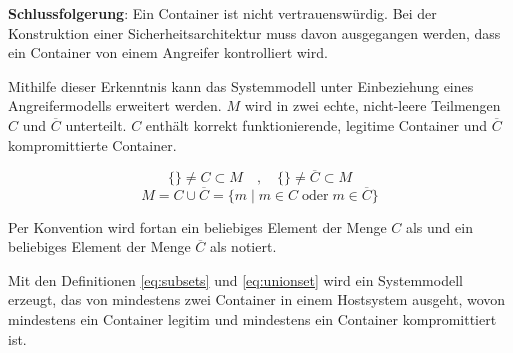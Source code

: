 \documentclass[../main.tex]{subfiles}
\begin{document}
    \textbf{Schlussfolgerung}: Ein Container ist nicht vertrauenswürdig. Bei der Konstruktion einer Sicherheitsarchitektur muss davon ausgegangen werden, dass ein Container von einem Angreifer kontrolliert wird.

    Mithilfe dieser Erkenntnis kann das Systemmodell unter Einbeziehung eines Angreifermodells erweitert werden. \(M\) wird in zwei echte, nicht-leere Teilmengen \(C\) und \(\overline{C}\) unterteilt. \(C\) enthält korrekt funktionierende, legitime Container und \(\overline{C}\) kompromittierte Container.

    \begin{equation}
    \label{eq:subsets}
      \{\}\neq C \subset M \quad,\quad \{\}\neq \overline{C} \subset M %
    \end{equation}
    \begin{equation}
    \label{eq:unionset}
      M = C \cup \overline{C} = \{m \; | \; m\in C \; \text{oder} \; m\in \overline{C}\}
    \end{equation}

    Per Konvention wird fortan ein beliebiges Element der Menge \(C\) als \cvalid{} und ein beliebiges Element der Menge \(\overline{C}\) als \cbroken{} notiert.


    Mit den Definitionen \ref{eq:subsets} und \ref{eq:unionset} wird ein Systemmodell erzeugt, das von mindestens zwei Container in einem Hostsystem ausgeht, wovon mindestens ein Container \cvalid{} legitim und mindestens ein Container \cbroken{} kompromittiert ist.
\end{document}

